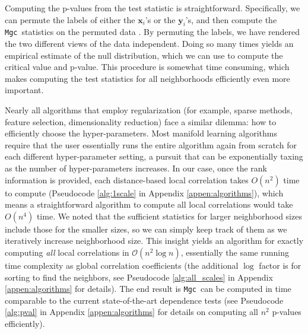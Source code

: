 \documentclass[11pt]{article}
\providecommand{\sct}[1]{{\sc \texttt{#1}}}
\providecommand{\mb}[1]{\boldsymbol{#1}}
\providecommand{\mc}[1]{\mathcal{#1}}
\newcommand{\Mgc}{\sct{Mgc}}
\newcommand{\mbx}{\ensuremath{\mb{x}}}
\newcommand{\mby}{\ensuremath{\mb{y}}}
\begin{document}
Computing the p-values from the test statistic is  straightforward.
Specifically, we can permute the labels of either the $\mbx_i$'s or the $\mby_i$'s, and then compute the \Mgc~statistics on the permuted data \cite{GoodPermutationBook}.  By permuting the labels, we have rendered the two different views of the data independent.  Doing so many times yields an empirical estimate of the null distribution, which we can use to compute the critical value and p-value. This procedure is somewhat time consuming, which makes computing the test statistics for all neighborhoods efficiently even more important.



Nearly all algorithms that employ regularization (for example, sparse methods, feature selection, dimensionality reduction) face a similar dilemma: how to efficiently choose the hyper-parameters.
% 
Most manifold learning algorithms require that the user essentially runs the entire algorithm again from scratch for each different hyper-parameter setting, a pursuit that can be exponentially taxing as the number of hyper-parameters increases.
In our case, once the rank information is provided, each distance-based local correlation takes $O(n^2)$ time to compute (Pseudocode \ref{alg:1scale} in Appendix \ref{appen:algorithms}), which means a straightforward algorithm to compute all local correlations would take $O(n^4)$ time.
% 
We noted that the sufficient statistics for larger neighborhood sizes include those for the smaller sizes, so we can simply keep track of them as we iteratively increase neighborhood size. 
This insight yields an algorithm for exactly computing \emph{all} local correlations in $\mc{O}(n^2 \log n)$, essentially the same running time complexity as  global correlation coefficients (the additional $\log$ factor is for sorting to find the neighbors, see Pseudocode \ref{alg:all_scales} in Appendix \ref{appen:algorithms} for details). The end result is \Mgc~can be computed in  time comparable to the current state-of-the-art dependence tests (see Pseudocode \ref{alg:pval} in Appendix \ref{appen:algorithms} for details on computing all $n^2$ p-values efficiently).
% 
\end{document}
